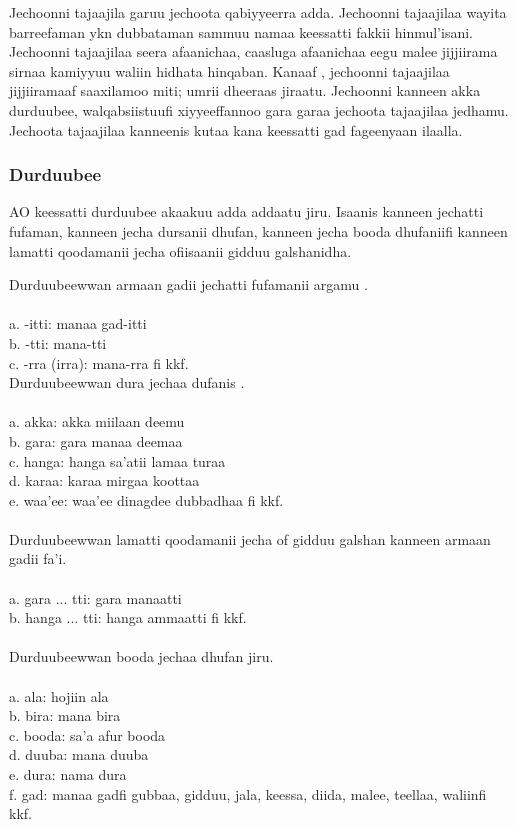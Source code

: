 \documentclass[11pt,b5paper]{book}
\begin{document}
Jechoonni tajaajila garuu jechoota qabiyyeerra adda. Jechoonni tajaajilaa wayita barreefaman ykn dubbataman sammuu namaa keessatti fakkii hinmul’isani. Jechoonni tajaajilaa seera afaanichaa, caasluga afaanichaa eegu malee jijjiirama sirnaa kamiyyuu waliin hidhata hinqaban. Kanaaf , jechoonni tajaajilaa jijjiiramaaf saaxilamoo miti; umrii dheeraas jiraatu. Jechoonni kanneen akka durduubee, walqabsiistuufi xiyyeeffannoo gara garaa jechoota tajaajilaa jedhamu. Jechoota tajaajilaa kanneenis kutaa kana keessatti gad fageenyaan ilaalla. 

\subsubsection{Durduubee}

AO keessatti durduubee akaakuu adda addaatu jiru. Isaanis kanneen jechatti fufaman, kanneen jecha dursanii dhufan,
kanneen jecha booda dhufaniifi kanneen lamatti qoodamanii jecha ofiisaanii gidduu galshanidha. 

Durduubeewwan armaan gadii jechatti fufamanii argamu \cite[p.50]{griefenow2001grammatical}. \\
\\
a. -itti: manaa gad-itti\\
b. -tti: mana-tti\\
c. -rra (irra): mana-rra fi kkf.\\

Durduubeewwan dura jechaa dufanis \cite[p.50]{griefenow2001grammatical}.\\
\\
a. akka: akka miilaan deemu\\
b. gara: gara manaa deemaa \\
c. hanga: hanga sa’atii lamaa turaa\\
d. karaa: karaa mirgaa koottaa \\
e. waa'ee: waa’ee dinagdee dubbadhaa fi kkf.\\
\\
Durduubeewwan lamatti qoodamanii jecha of gidduu galshan\cite[p.53]{griefenow2001grammatical} kanneen armaan gadii fa’i. \\
\\
a. gara ... tti: gara manaatti\\
b. hanga ... tti: hanga ammaatti fi kkf.\\
\\
Durduubeewwan booda jechaa dhufan \cite[p.52]{griefenow2001grammatical} jiru.\\
\\
a. ala: hojiin ala \\
b. bira: mana bira\\
c. booda: sa'a afur booda\\
d. duuba: mana duuba\\
e. dura: nama dura\\
f. gad: manaa gadfi gubbaa, gidduu, jala, keessa, diida, malee, teellaa, waliinfi kkf.
\end{document}
